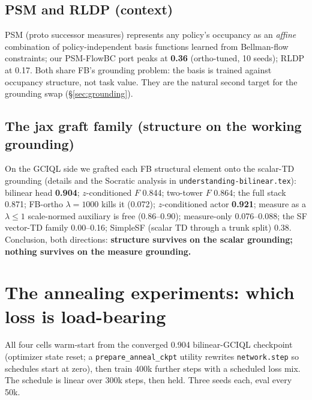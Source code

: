 \documentclass[11pt]{article}
\begin{document}
\subsection{PSM and RLDP (context)}
PSM (proto successor measures) represents any policy's occupancy as an \emph{affine}
combination of policy-independent basis functions learned from Bellman-flow constraints;
our PSM-FlowBC port peaks at \textbf{0.36} (ortho-tuned, 10 seeds); RLDP at 0.17. Both
share FB's grounding problem: the basis is trained against occupancy structure, not task
value. They are the natural second target for the grounding swap (\S\ref{sec:grounding}).

\subsection{The jax graft family (structure on the working grounding)}
On the GCIQL side we grafted each FB structural element onto the scalar-TD grounding
(details and the Socratic analysis in \texttt{understanding-bilinear.tex}): bilinear head
\textbf{0.904}; $z$-conditioned $F$ 0.844; two-tower $F$ 0.864; the full stack 0.871;
FB-ortho $\lambda{=}1000$ kills it (0.072); $z$-conditioned actor \textbf{0.921}; measure as
a $\lambda\le1$ scale-normed auxiliary is free (0.86--0.90); measure-only 0.076--0.088;
the SF vector-TD family 0.00--0.16; SimpleSF (scalar TD through a trunk split) 0.38.
Conclusion, both directions: \textbf{structure survives on the scalar grounding; nothing
survives on the measure grounding.}

\section{The annealing experiments: which loss is load-bearing}\label{sec:anneal}

All four cells warm-start from the converged 0.904 bilinear-GCIQL checkpoint (optimizer
state reset; a \texttt{prepare\_anneal\_ckpt} utility rewrites \texttt{network.step} so
schedules start at zero), then train 400k further steps with a scheduled loss mix. The
schedule is linear over 300k steps, then held. Three seeds each, eval every 50k.
\end{document}
